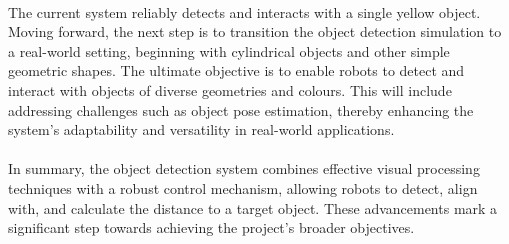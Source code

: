 \paragraph*{}
The current system reliably detects and interacts with a single yellow object. Moving forward, the next step is to transition the object detection simulation to a real-world setting, beginning with cylindrical objects and other simple geometric shapes. The ultimate objective is to enable robots to detect and interact with objects of diverse geometries and colours. This will include addressing challenges such as object pose estimation, thereby enhancing the system's adaptability and versatility in real-world applications.

\paragraph*{}
In summary, the object detection system combines effective visual processing techniques with a robust control mechanism, allowing robots to detect, align with, and calculate the distance to a target object. These advancements mark a significant step towards achieving the project's broader objectives.


